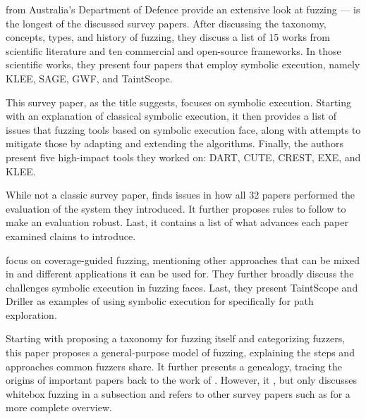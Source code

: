 \documentclass{article}
\begin{document}
\begin{multicols}{2}
    \citeauthor{FuzzingTheStateOfTheArt} from Australia's Department of Defence provide an extensive look at fuzzing —  is the longest of the discussed survey papers. After discussing the taxonomy, concepts, types, and history of fuzzing, they discuss a list of 15 works from scientific literature and ten commercial and open-source frameworks. In those scientific works, they present four papers that employ symbolic execution, namely KLEE\cite{KLEE}, SAGE\cite{SAGE}, GWF\cite{GWF}, and TaintScope\cite{TaintScope}.

    This survey paper, as the title suggests, focuses on symbolic execution. Starting with an explanation of classical symbolic execution, it then provides a list of issues that fuzzing tools based on symbolic execution face, along with attempts to mitigate those by adapting and extending the algorithms. Finally, the authors present five high-impact tools they worked on: DART\cite{DART}, CUTE\cite{CUTE}, CREST\cite{CREST}, EXE\cite{EXE}, and KLEE\cite{KLEE}.

    While not a classic survey paper,  finds issues in how all 32 papers performed the evaluation of the system they introduced. It further proposes rules to follow to make an evaluation robust. Last, it contains a list of what advances each paper examined claims to introduce.

    \citeauthor{FuzzingASurvey} focus on coverage-guided fuzzing, mentioning other approaches that can be mixed in and different applications it can be used for. They further broadly discuss the challenges symbolic execution in fuzzing faces. Last, they present TaintScope\cite{TaintScope} and Driller\cite{Driller} as examples of using symbolic execution for specifically for path exploration.

    Starting with proposing a taxonomy for fuzzing itself and categorizing fuzzers, this paper proposes a general-purpose model of fuzzing, explaining the steps and approaches common fuzzers share. It further presents a genealogy, tracing the origins of important papers back to the work of \citeauthor{UNIX}. However, it \cite{ArtScienceEng}, but only discusses whitebox fuzzing in a subsection and refers to other survey papers such as \cite{Orchestrated, AllYouEverWanted} for a more complete overview.


\end{multicols}
\end{document}
